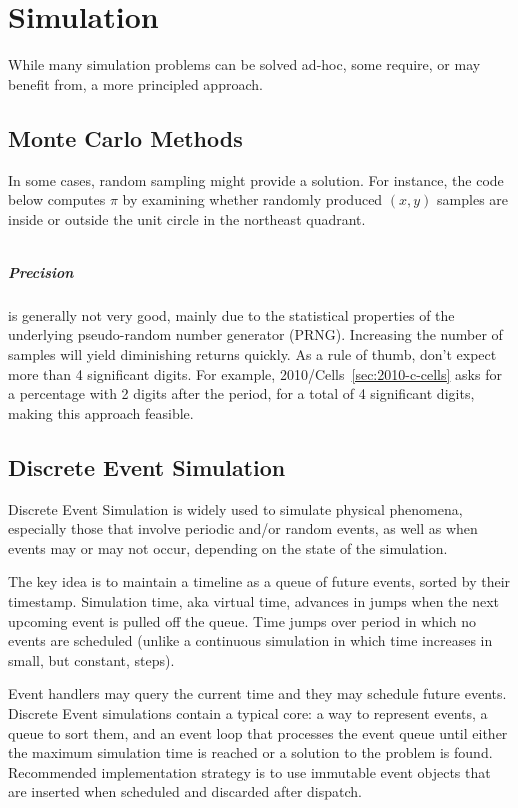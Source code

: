 \chapter{Simulation}

While many simulation problems can be solved ad-hoc, some require, or may benefit
from, a more principled approach.

\section{Monte Carlo Methods}

In some cases, random sampling might provide a solution.
For instance, the code below computes $\pi$ by examining whether
randomly produced $(x, y)$ samples are inside or outside the unit 
circle in the northeast quadrant.

\inputminted[fontsize=\footnotesize,linenos=true]{java}{code/Pi.java}

\paragraph{Precision} is generally not very good, mainly due to the  
statistical properties of the underlying pseudo-random number generator (PRNG).
Increasing the number of samples will yield diminishing returns quickly.
As a rule of thumb, don't expect more than 4 significant digits.
For example, 2010/Cells~\ref{sec:2010-c-cells} asks for a percentage with 2 digits after the
period, for a total of 4 significant digits, making this approach feasible.

\section{Discrete Event Simulation}

Discrete Event Simulation is widely used to simulate physical phenomena, especially
those that involve periodic and/or random events, as well as when events may or may
not occur, depending on the state of the simulation.

The key idea is to maintain a timeline as a queue of future events, sorted
by their timestamp.  Simulation time, aka virtual time, advances in jumps when
the next upcoming event is pulled off the queue.  Time jumps over period in which
no events are scheduled (unlike a continuous simulation in which time increases
in small, but constant, steps).

Event handlers may query the current time and they may schedule future events.
Discrete Event simulations contain a typical core: a way to represent events, 
a queue to sort them, and an event loop that processes the event queue until
either the maximum simulation time is reached or a solution to the problem is found.
Recommended implementation strategy is to use immutable event objects that are
inserted when scheduled and discarded after dispatch.

